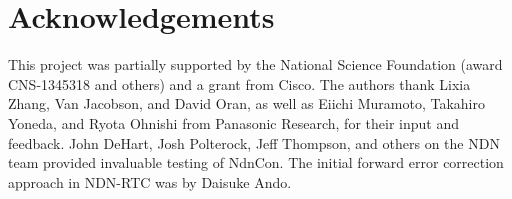 \documentclass{icn/sig-alternate-2012} %
\newcommand{\ndnrtcName}{NDN-RTC} %
\newcommand{\ndnconName}{NdnCon}
\begin{document}
\section{Acknowledgements}
\label{sec:Acknowledgements}
This project was partially supported by the National Science Foundation (award CNS-1345318 and others) and a grant from Cisco.   The authors thank Lixia Zhang, Van Jacobson, and David Oran, as well as Eiichi Muramoto, Takahiro Yoneda, and Ryota Ohnishi from Panasonic Research, for their input and feedback. John DeHart, Josh Polterock, Jeff Thompson, and others on the NDN team provided invaluable testing of \ndnconName{}.  The initial forward error correction approach in \ndnrtcName{} was by Daisuke Ando. 



\end{document}
